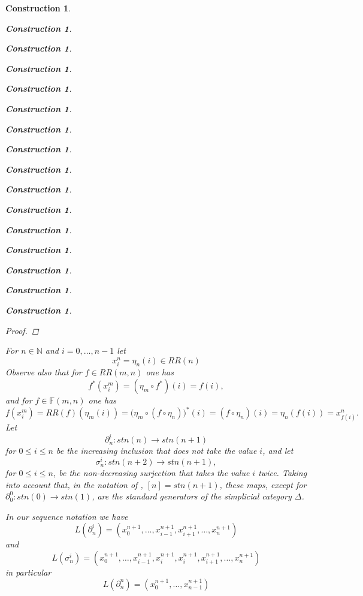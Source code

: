 \documentclass[onecolumn,12pt]{amsart}
\numberwithin{proposition}{subsection}
\newtheorem{construction}[proposition]{Construction}
\newcommand{\sr}{\rightarrow}
\newcommand{\nn}{{\mathbb N}}
\newcommand{\nat}{\nn}
\newcommand{\mbind}[1]{{#1^*}}
\newcommand{\FF}{{\mathbb F}}
\begin{document}
\begin{construction}
\begin{construction}
\begin{construction}
\begin{construction}
\begin{construction}
\begin{construction}
\begin{construction}
\begin{construction}
\begin{construction}
\begin{construction}
\begin{construction}
\begin{construction}
\begin{construction}
\begin{construction}
\begin{construction}
\begin{construction}
\begin{proof}
\end{proof}
%
For $n\in\nat$ and $i=0,\dots,n-1$ let
%
$$x_i^n=\eta_{n}(i)\in RR(n)$$
%
Observe also that for $f\in RR(m,n)$ one has
%
\begin{equation}\label{2015.08.24.eq5}
\mbind{f}(x_i^m)=(\eta_{m}\circ\mbind{f})(i)=f(i),
\end{equation}%
%
and for $f\in \FF(m,n)$ one has
%
\begin{equation}\label{2016.01.15.eq1}
f(x_i^m)=RR(f)(\eta_{m}(i))=(\eta_{m}\circ \mbind{(f\circ \eta_{n}))}(i)=(f\circ \eta_{n})(i)=\eta_{n}(f(i))=x_{f(i)}^n.
\end{equation}%
%
Let 
%
$$\partial^{i}_{n}:stn(n)\sr stn(n+1)$$
%
for $0\le i\le n$ be the increasing inclusion that does not take the value $i$, and let
%
$$\sigma^{i}_{n}:stn(n+2)\sr stn(n+1),$$
%
for $0\le i\le n$, be the non-decreasing surjection that takes the value $i$
twice. Taking into account that, in the notation of \cite{GabZis},
$[n]=stn(n+1)$, these maps, except for $\partial^0_0:stn(0)\sr stn(1)$, are the standard generators of the simplicial category
$\Delta$.

In our sequence notation we have
%
\begin{equation}\label{2015.08.24.eq7}
L(\partial^{i}_{n})=(x_0^{n+1},\dots,x_{i-1}^{n+1},x_{i+1}^{n+1},\dots,x_n^{n+1})
\end{equation}%
%
and
%
\begin{equation}\label{2015.08.24.eq8}
L(\sigma^{i}_{n})=(x_0^{n+1},\dots,x_{i-1}^{n+1},x_i^{n+1},x_i^{n+1},x_{i+1}^{n+1},\dots,x_n^{n+1})
\end{equation}%
%
in particular
%
\begin{equation}\label{2015.07.12.eq5}
L(\partial^{n}_n)=(x_0^{n+1},\dots,x_{n-1}^{n+1})
\end{equation}%
%


\end{construction}
\end{construction}
\end{construction}
\end{construction}
\end{construction}
\end{construction}
\end{construction}
\end{construction}
\end{construction}
\end{construction}
\end{construction}
\end{construction}
\end{construction}
\end{construction}
\end{construction}
\end{construction}
\end{document}
